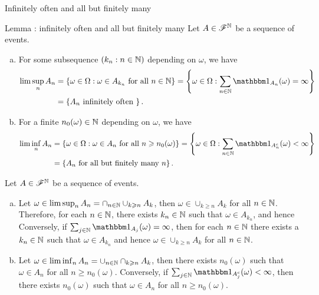 \documentclass[12pt,aspectratio=169]{beamer}
\begin{document}
\begin{frame}{Infinitely often and all but finitely many}
\begin{block}{Lemma : infinitely often and all but finitely many}
Let $A \in \mathscr{F}^{\mathbb{N}}$ be a sequence of events. 
\begin{enumerate}[(a)]
\item<1-> For some subsequence $(k_n: n \in \mathbb{N})$ depending on $\omega$, we have 
\begin{align*}
\lim\sup_nA_n 
& = \set{\omega \in \Omega: \omega \in A_{k_n} \text{ for all } n \in \N} 
= \set{\omega \in \Omega: \sum_{n \in \N}\Ind{A_n}(\omega) = \infty} \\
& = \set{A_n \text{ infinitely often }}.
\end{align*}
\item<2-> For a finite $n_0(\omega) \in \mathbb{N}$ depending on $\omega$, we have 
\begin{align*}
\lim\inf_nA_n 
& = \set{\omega \in \Omega: \omega \in A_n \text{ for all  }n \ge n_0(\omega)}
= \set{\omega \in \Omega: \sum_{n \in \N}\Ind{A_n^c}(\omega) < \infty} \\
& = \set{A_n \text{ for all but finitely many }n}.
\end{align*}
\end{enumerate}
\end{block}
\end{frame}

\begin{frame}
\begin{Proof} 
Let $A \in \mathscr{F}^{\mathbb{N}}$ be a sequence of events. 
\begin{enumerate}[(a)]
\item <1-> Let $\omega \in \lim\sup_nA_n = \cap_{n \in \mathbb{N}}\cup_{k \geqslant n}A_k$, then $\omega \in \cup_{k \ge n}A_k$ for all $n \in \mathbb{N}$. 
Therefore, for each $n \in \mathbb{N}$, there exists $k_n \in \mathbb{N}$ such that $\omega \in A_{k_n}$, and hence  
Conversely, if $\sum_{j  \in \N}\Ind{A_j}(\omega) = \infty$, then for each $n \in \mathbb{N}$ there exists a $k_n \in \mathbb{N}$ such that $\omega \in A_{k_n}$ and hence $\omega \in \cup_{k \ge n}A_k$ for all $n \in \mathbb{N}$.

\item <2-> Let $\omega\in \lim\inf_nA_n = \cup_{n\in\mathbb{N}}\cap_{k\geqslant n}A_k$, then there exists $n_0(\omega)$ such that $\omega \in A_n$ for all $n \ge n_0(\omega)$. 
Conversely, if $\sum_{j  \in \N}\Ind{A_j^c}(\omega) < \infty$, then there exists $n_0(\omega)$ such that $\omega \in A_n$ for all $n \ge n_0(\omega)$.
\end{enumerate}
\end{Proof}
\end{frame}
\end{document}
